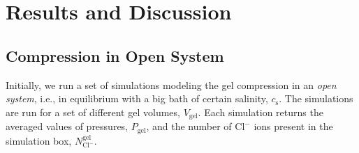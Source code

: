 \documentclass[gels,article,accept,pdftex,moreauthors]{Definitions/mdpi}
\newcommand{\ie}{{i.e.,} }
\newcommand{\Ncl}{N_\mathrm{Cl^-}}
\newcommand{\gel}{^\mathrm{gel}}
\newcommand{\cl}{\mathrm{Cl^-}}
\newcommand{\cs}{c_{\mathrm{s}}}
\newcommand{\Vgel}{V_\mathrm{gel}}
\begin{document}
\section{Results and Discussion}

\subsection{Compression in Open System}

Initially, we run a set of simulations modeling the gel compression in an \emph{open system}, \ie in equilibrium with a big bath of certain salinity, $\cs$. 
The simulations are run for a set of different gel volumes, $\Vgel$. 
Each simulation returns the averaged values of pressures, $P_\mathrm{gel}$, and the number of $\cl$ ions present in the simulation box, $\Ncl\gel$. 
\end{document}
